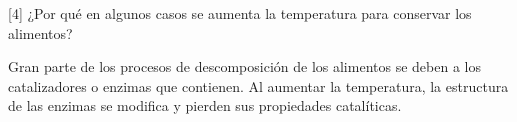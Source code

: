 [4]  ¿Por qué en algunos casos se aumenta la temperatura para conservar los alimentos?

\begin{solutionorlines}
    Gran parte de los procesos de descomposición de los alimentos se deben a los catalizadores o enzimas que contienen. Al aumentar la temperatura, la estructura de las enzimas se modifica y pierden sus propiedades catalíticas.
\end{solutionorlines}